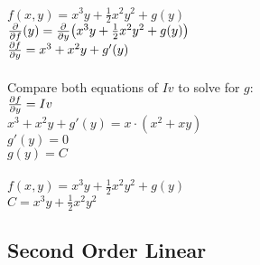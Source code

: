 \documentclass{article}
\begin{document}
				$f(x,y) = x^{3}y + \frac{1}{2}x^{2}y^{2} + g(y)$ \\
				$\pdv{f}(y) = \pdv{y}\qty(x^{3}y + \frac{1}{2}x^{2}y^{2} + g(y))$ \\
				$\pdv{f}{y} = x^{3} + x^{2}y + g'(y)$ \\
				\\
				Compare both equations of $Iv$ to solve for $g$: \\
				$\pdv{f}{y} = Iv$ \\
				$x^{3} + x^{2}y + g'(y) = x \cdot (x^2 + xy)$ \\
				$g'(y) = 0$ \\
				$g(y) = C$ \\
				\\
				$f(x,y) = x^{3}y + \frac{1}{2}x^{2}y^{2} + g(y)$ \\
				$C = x^{3}y + \frac{1}{2}x^{2}y^{2}$ \\
				
		\subsection{Second Order Linear}
		
\end{document}
